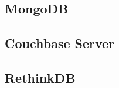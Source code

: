 	\subsection{MongoDB}\label{nosql-mongodb}
	
	\subsection{Couchbase Server}\label{intro-couchbase}
	
	\subsection{RethinkDB}
			
